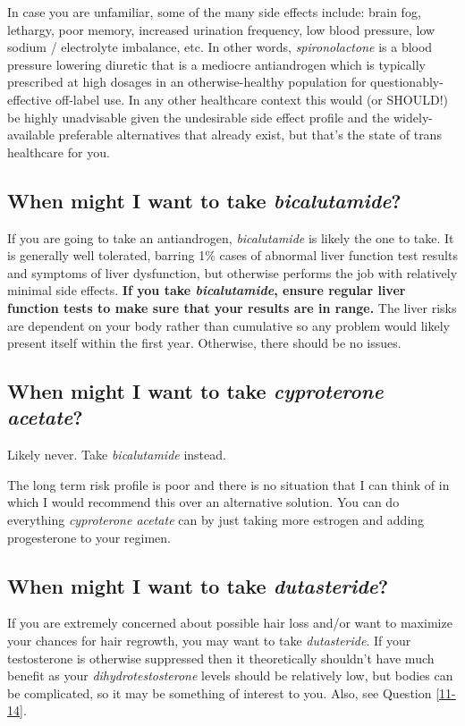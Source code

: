 \documentclass{article}
\begin{document}
In case you are unfamiliar, some of the many side effects include: brain fog, lethargy, poor memory, increased urination frequency, low blood pressure, low sodium / electrolyte imbalance, etc. In other words, \textit{spironolactone} is a blood pressure lowering diuretic that is a mediocre antiandrogen which is typically prescribed at high dosages in an otherwise-healthy population for questionably-effective off-label use. In any other healthcare context this would (or SHOULD!) be highly unadvisable given the undesirable side effect profile and the widely-available preferable alternatives that already exist, but that's the state of trans healthcare for you.

\subsection{When might I want to take \textit{bicalutamide}?}

If you are going to take an antiandrogen, \textit{bicalutamide} is likely the one to take. It is generally well tolerated, barring 1\% cases of abnormal liver function test results and symptoms of liver dysfunction, but otherwise performs the job with relatively minimal side effects. \textbf{If you take \textit{bicalutamide}, ensure regular liver function tests to make sure that your results are in range.} The liver risks are dependent on your body rather than cumulative so any problem would likely present itself within the first year. Otherwise, there should be no issues.

\subsection{When might I want to take \textit{cyproterone acetate}?}

Likely never. Take \textit{bicalutamide} instead.

The long term risk profile is poor and there is no situation that I can think of in which I would recommend this over an alternative solution. You can do everything \textit{cyproterone acetate} can by just taking more estrogen and adding progesterone to your regimen.

\subsection{When might I want to take \textit{dutasteride}?}

If you are extremely concerned about possible hair loss and/or want to maximize your chances for hair regrowth, you may want to take \textit{dutasteride}. If your testosterone is otherwise suppressed then it theoretically shouldn’t have much benefit as your \textit{dihydrotestosterone} levels should be relatively low, but bodies can be complicated, so it may be something of interest to you. Also, see Question \ref{11-14}.
\end{document}
